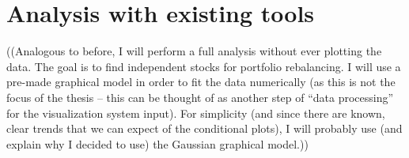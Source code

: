 \section{Analysis with existing tools}
\label{sec:numerical:analysis}

((Analogous to before, I will perform a full analysis without ever plotting the data. The goal is to find independent stocks for portfolio rebalancing. I will use a pre-made graphical model in order to fit the data numerically (as this is not the focus of the thesis – this can be thought of as another step of “data processing” for the visualization system input). For simplicity (and since there are known, clear trends that we can expect of the conditional plots), I will probably use (and explain why I decided to use) the Gaussian graphical model.))